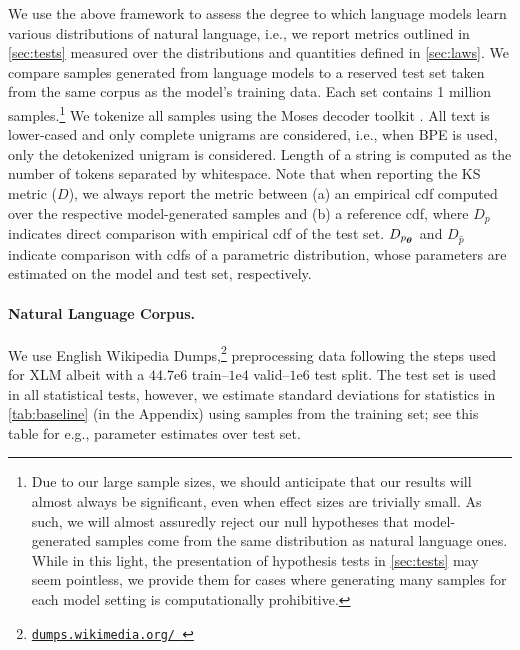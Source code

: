 \documentclass[11pt,a4paper]{article}
\newcommand\rurl[1]{%
  \href{https://#1}{\nolinkurl{#1}}%
}
\newcommand{\calY}{\mathcal{Y}}
\newcommand{\vtheta}{{\boldsymbol \theta}}
\newcommand{\ptheta}{p_{\scaleto{\vtheta}{4pt}}}
\newcommand{\note}[4][]{\todo[author=#2,color=#3,size=\scriptsize,fancyline,caption={},#1]{#4}} %
\newcommand{\clara}[2][]{\note[#1]{clara}{orange}{#2}}
\begin{document}
We use the above framework to assess the degree to which language models learn various distributions of natural language, i.e., we report metrics outlined in \cref{sec:tests} measured over the distributions and quantities defined in \cref{sec:laws}. 
We compare samples generated from language models to a reserved test set taken from the same corpus as the model's training data. Each set contains 1 million samples.\footnote{Due to our large sample sizes, we should anticipate that our results will almost always be significant, even when effect sizes are trivially small. As such, we will almost assuredly reject our null hypotheses that model-generated samples come from the same distribution as natural language ones. 
While in this light, the presentation of hypothesis tests in \cref{sec:tests} may seem pointless, we provide them for cases where generating many samples for each model setting is computationally prohibitive. } We tokenize all samples using the Moses decoder toolkit \cite{moses}. All text is lower-cased and only complete unigrams are considered, i.e., when BPE is used, only the detokenized unigram is considered. Length of a string is computed as the number of tokens separated by whitespace. Note that when reporting the KS metric ($D$), we always report the metric between (a) an empirical cdf\clara{do we need to clarify how this is done?} computed over the respective model-generated samples and (b) a reference cdf, where $D_{p}$ indicates direct comparison with empirical cdf of the test set. $D_{\ptheta}$ and $D_{\hat p}$ indicate comparison with cdfs of a parametric distribution, whose parameters are estimated on the model and test set, respectively. %


\paragraph{Natural Language Corpus.}
We use English Wikipedia Dumps,\footnote{\rurl{dumps.wikimedia.org/ }} preprocessing data following the steps used for XLM \cite{xlm} albeit with a $44.7\mathrm{e}{6}$ train--$1\mathrm{e}{4}$ valid--$1\mathrm{e}{6}$ test split. The test set is used in all statistical tests, however, we estimate standard deviations for statistics in \cref{tab:baseline} (in the Appendix) using samples from the training set; see this table for e.g., parameter estimates over test set. %
\end{document}
